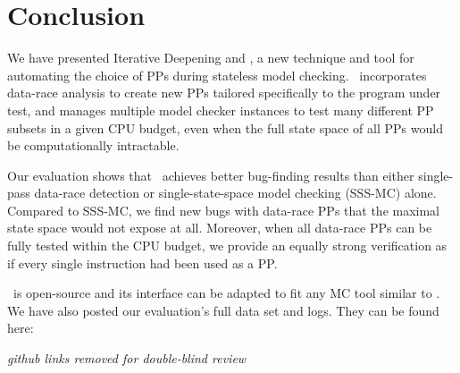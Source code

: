 \documentclass[pldi]{sigplanconf-pldi15}
\begin{document}

\section{Conclusion}
\label{sec:conclusion}


We have presented Iterative Deepening and \quicksand, a new technique and tool for automating the choice of PPs during stateless model checking.
\quicksand~incorporates data-race analysis to create new PPs tailored specifically to the program under test,
and manages multiple model checker instances to test many different PP subsets in a given CPU budget, even when the full state space of all PPs would be computationally intractable.

Our evaluation shows that \quicksand~achieves better bug-finding results than either single-pass data-race detection or single-state-space model checking (SSS-MC) alone.
Compared to SSS-MC,
we find new bugs with data-race PPs that the maximal state space would not expose at all.
Moreover, when all data-race PPs can be fully tested within the CPU budget, we provide an equally strong verification as if every single instruction had been used as a PP.

\quicksand~is open-source and its interface can be adapted to fit any MC tool similar to \landslide.
We have also posted our evaluation's full data set and logs.
They can be found here:


{\em github links removed for double-blind review}
%
\end{document}
